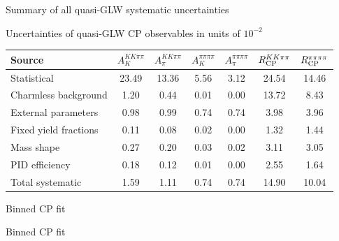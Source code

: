 \documentclass{beamer}
\begin{document}
\begin{frame}{Summary of all quasi-GLW systematic uncertainties}
  \begin{center}
    Uncertainties of quasi-GLW CP observables in units of $10^{-2}$
  \end{center}
  \footnotesize
  \vspace{0.02cm}
  \begin{center}
    \begin{tabular}{lcccccc} 
      \hline
      Source & $A_K^{KK\pi\pi}$ & $A_\pi^{KK\pi\pi}$ & $A_K^{\pi\pi\pi\pi}$ & $A_\pi^{\pi\pi\pi\pi}$ & $R_{\rm CP}^{KK\pi\pi}$ & $R_{\rm CP}^{\pi\pi\pi\pi}$ \\
      \hline
      Statistical                                   & 23.49 & 13.36 &  5.56 &  3.12 & 24.54 & 14.46 \\
      \hline
      Charmless background                          &  1.20 &  0.44 &  0.01 &  0.00 & 13.72 &  8.43 \\
      External parameters                           &  0.98 &  0.99 &  0.74 &  0.74 &  3.98 &  3.96 \\
      Fixed yield fractions                         &  0.11 &  0.08 &  0.02 &  0.00 &  1.32 &  1.44 \\
      Mass shape                                    &  0.27 &  0.20 &  0.03 &  0.02 &  3.11 &  3.05 \\
      PID efficiency                                &  0.18 &  0.12 &  0.01 &  0.00 &  2.55 &  1.64 \\
      \hline
      Total systematic                              &  1.59 &  1.11 &  0.74 &  0.74 & 14.90 & 10.04 \\
      \hline
    \end{tabular}
  \end{center}
\end{frame}

\begin{frame}{Binned CP fit}
  \begin{center}
    {\huge Binned CP fit}
  \end{center}
\end{frame}
\end{document}
